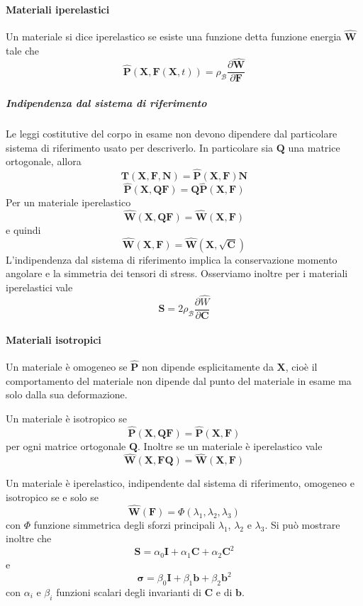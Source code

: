 \paragraph{Materiali iperelastici}
Un materiale si dice iperelastico se esiste una funzione detta funzione energia $\widehat{\mathbf{W}}$ tale che 
\begin{equation*}
\widehat{\mathbf{P}}(\mathbf{X},\mathbf{F}(\mathbf{X},t))=\rho_{\mathcal{B}}\frac{\partial \widehat{\mathbf{W}}}{\partial \mathbf{F}}
\end{equation*}
\subparagraph{\emph{Indipendenza dal sistema di riferimento}}
Le leggi costitutive del corpo in esame non devono dipendere dal particolare sistema di riferimento usato per descriverlo.
In particolare sia $\mathbf{Q}$ una matrice ortogonale, allora 
$$\mathbf{T}(\mathbf{X},\mathbf{F},\mathbf{N}) = \widehat{\mathbf{P}}(\mathbf{X},\mathbf{F})\mathbf{N} $$
$$\widehat{\mathbf{P}}(\mathbf{X},\mathbf{Q}\mathbf{F}) = \mathbf{Q}\widehat{\mathbf{P}}(\mathbf{X},\mathbf{F}) $$
Per un materiale iperelastico 
$$\widehat{\mathbf{W}}(\mathbf{X},\mathbf{Q}\mathbf{F}) = \widehat{\mathbf{W}}(\mathbf{X},\mathbf{F}) $$
e quindi
$$\widehat{\mathbf{W}}(\mathbf{X},\mathbf{F}) = \widehat{\mathbf{W}}(\mathbf{X},\sqrt{\mathbf{C}}) $$
L'indipendenza dal sistema di riferimento implica la conservazione momento angolare e la simmetria dei tensori di stress.
Osserviamo inoltre per i materiali iperelastici vale
\begin{equation*}
\widehat{\mathbf{S}} = 2\rho_{\mathcal{B}}\frac{\partial\widehat{W}}{\partial\mathbf{C}}
\end{equation*}
\paragraph{Materiali isotropici}
Un materiale è omogeneo se $\widehat{\mathbf{P}}$ non dipende esplicitamente da $\mathbf{X}$, cioè il comportamento del materiale non dipende dal punto del materiale in esame ma solo dalla sua deformazione.

Un materiale è isotropico se
$$\widehat{\mathbf{P}}(\mathbf{X},\mathbf{Q}\mathbf{F}) = \widehat{\mathbf{P}}(\mathbf{X},\mathbf{F}) $$
per ogni matrice ortogonale $\mathbf{Q}$.
Inoltre se un materiale è iperelastico vale 
$$\widehat{\mathbf{W}}(\mathbf{X},\mathbf{F}\mathbf{Q}) = \widehat{\mathbf{W}}(\mathbf{X},\mathbf{F}) $$

Un materiale è iperelastico, indipendente dal sistema di riferimento, omogeneo e isotropico se e solo se
$$\widehat{\mathbf{W}}(\mathbf{F}) = \Phi(\lambda_1,\lambda_2,\lambda_3) $$
con $\Phi$ funzione simmetrica degli sforzi principali $\lambda_1$, $\lambda_2$ e $\lambda_3$.
Si può mostrare inoltre che
$$\mathbf{S}=\alpha_0\mathbf{I}+\alpha_1\mathbf{C}+\alpha_2\mathbf{C}^2 $$
e
$$\boldsymbol{\sigma}=\beta_0\mathbf{I}+\beta_1\mathbf{b}+\beta_2\mathbf{b}^2 $$
con $\alpha_i$ e $\beta_i$ funzioni scalari degli invarianti di $\mathbf{C}$  e di $\mathbf{b}$.

